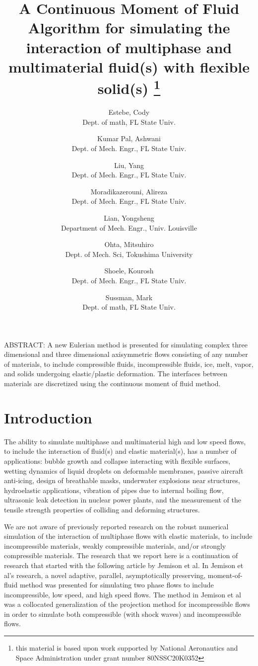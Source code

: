 \documentclass[]{article}
\title{A Continuous Moment of Fluid 
  Algorithm for simulating the interaction of
  multiphase and multimaterial fluid(s) with flexible solid(s)
  \thanks{this material is based upon work supported by National
   Aeronautics and Space Administration under grant number
   80NSSC20K0352}}
\author{
  Estebe, Cody \\
  Dept. of math, FL State Univ. 
  \and
  Kumar Pal, Ashwani \\
  Dept. of Mech. Engr., FL State Univ.
  \and
  Liu, Yang \\
  Dept. of Mech. Engr., FL State Univ.
  \and
  Moradikazerouni, Alireza \\
  Dept. of Mech. Engr., FL State Univ.
  \and
  Lian, Yongsheng \\
  Department of Mech. Engr., Univ. Louisville
  \and
  Ohta, Mitsuhiro \\
  Dept. of Mech. Sci, Tokushima University 
  \and
  Shoele, Kourosh  \\
  Dept. of Mech. Engr., FL State Univ.
  \and
  Sussman, Mark \\
  Dept. of math, FL State Univ. 
}
\begin{document}
\maketitle

ABSTRACT:
A new Eulerian method is presented for simulating complex three dimensional
and three dimensional axisymmetric flows
consisting of any number of materials, to include compressible
fluids, incompressible fluids, ice, melt, vapor, and 
solids undergoing elastic/plastic deformation.  
The interfaces between materials
are discretized using the continuous moment of fluid method.
 
\linenumbers

\section{Introduction}

The ability to simulate multiphase and multimaterial high and low 
speed flows,
to include the interaction of fluid(s) and elastic material(s),
has a number of applications:
bubble growth and collapse interacting with flexible
surfaces\cite{xiong2026bubble,xu2019experimental,
wang2017multiphase,MaHsiaoGnanaskandanDeng2025},
wetting dynamics of liquid droplets on deformable 
membranes\cite{MokbelMokbelLieseWeberAland2024,
kim2018dynamics,gao2026experimental,jin2025instantaneous},
passive aircraft anti-icing\cite{liu2018experimental},
design of breathable masks\cite{dressaire2015drop}, 
underwater explosions near 
structures\cite{leger2023experimental,yin2022experimental,chen2026numerical,
gao2025study,he2024research,wardlaw2000fluid,sandusky1999dynamic}, 
hydroelastic applications\cite{MENG2022114522},
vibration of pipes due to internal boiling flow\cite{AN2016201},
ultrasonic leak detection in nuclear power plants\cite{choi2024novel},
and the measurement of the tensile strength properties of colliding
and deforming structures\cite{cui2024oblique}.

We are not aware of previously reported research on the robust numerical
simulation of the interaction of multiphase flows with elastic materials, 
to include incompressible materials, weakly compressible materials, and/or
strongly compressible materials.  The research that we report here is a
continuation of research that started with the following
article by Jemison et al\cite{jemison2014compressible}.  In Jemison et al's
research, a novel adaptive, parallel, asymptotically 
preserving\cite{kwatra2009method,BIBAL2024112750,boscarino2018all,
scandurra2016numerical},
moment-of-fluid method was presented
for simulating two phase flows to include incompressible, low speed, and
high speed flows.  The method in Jemison et al was a collocated generalization
of the projection method for incompressible flows\cite{jemison2013coupled} 
in order to simulate both compressible (with shock waves) and 
incompressible flows.
\end{document}
